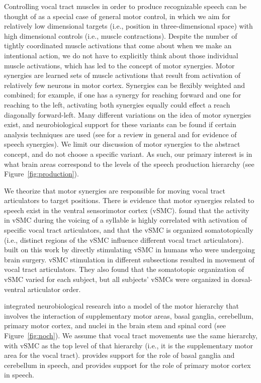 Controlling vocal tract muscles
in order to produce recognizable speech
can be thought of as a special case of
general motor control,
in which we aim for relatively
low dimensional targets
(i.e., position in three-dimensional space)
with high dimensional controls
(i.e., muscle contractions).
Despite the number of tightly coordinated
muscle activations that come about
when we make an intentional action,
we do not have to explicitly
think about those individual muscle activations,
which has led to the concept
of motor synergies.
Motor synergies are learned sets of
muscle activations that result
from activation of relatively few
neurons in motor cortex.
Synergies can be flexibly weighted
and combined;
for example, if one has a synergy
for reaching forward and one for
reaching to the left,
activating both synergies
equally could effect
a reach diagonally forward-left.
Many different variations
on the idea of motor synergies exist,
and neurobiological support
for these variants
can be found if certain
analysis techniques are used
(see \citet{tresch2009}
for a review in general
and \citet{smith2004,smith2006}
for evidence of speech synergies).
We limit our discussion
of motor synergies to the abstract concept,
and do not choose a specific variant.
As such, our primary interest
is in what brain areas correspond
to the levels of the speech production hierarchy
(see Figure~\ref{fig:production}).

We theorize that motor synergies
are responsible
for moving vocal tract articulators
to target positions.
There is evidence that motor synergies
related to speech
exist in the ventral sensorimotor cortex (vSMC).
\citet{bouchard2013} found that the activity
in vSMC during the voicing of a syllable
is highly correlated with
activation of specific vocal tract articulators,
and that the vSMC is organized somatotopically
(i.e., distinct regions of the vSMC
influence different vocal tract articulators).
\citet{breshears2015} built on this work
by directly stimulating vSMC in humans
who were undergoing brain surgery.
vSMC stimulation in different subsections
resulted in movement of vocal tract articulators.
They also found that the somatotopic organization
of vSMC varied for each subject,
but all subjects' vSMCs were organized
in dorsal-ventral articulator order.

\citet{dewolf2010} integrated neurobiological research
into a model of the motor hierarchy
that involves the interaction of
supplementary motor areas,
basal ganglia, cerebellum,
primary motor cortex,
and nuclei in the brain stem and spinal cord
(see Figure~\ref{fig:noch}).
We assume that vocal tract movements
use the same hierarchy,
with vSMC as the top level of that hierarchy
(i.e., it is the supplementary motor area
for the vocal tract).
\citet{wildgruber2001} provides support
for the role of basal ganglia
and cerebellum in speech,
and \citet{brown2009}
provides support for
the role of primary motor cortex
in speech.

